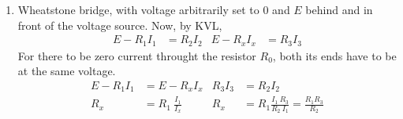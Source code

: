 \begin{enumerate}
\item Wheatstone bridge, with voltage arbitrarily set to 0 and $ E $ behind and in
front of the voltage source. Now, by KVL,
\begin{align}
    E - R_1 I_1 & = R_2 I_2 &
    E - R_x I_x & = R_3 I_3
\end{align}
For there to be zero current throught the resistor $ R_0 $, both its ends have
to be at the same voltage.
\begin{align}
    E - R_1 I_1 & = E - R_x I_x                                         &
    R_3 I_3     & = R_2 I_2                                               \\
    R_x         & = R_1\ \frac{I_1}{I_x}                                &
    R_x         & = R_1 \frac{I_1\ R_3}{R_2\ I_1} = \frac{R_1 R_3}{R_2}
\end{align}


\end{enumerate}

